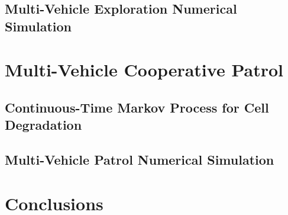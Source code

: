 \subsection{Multi-Vehicle Exploration Numerical Simulation}

\section{Multi-Vehicle Cooperative Patrol}

\subsection{Continuous-Time Markov Process for Cell Degradation}

\subsection{Multi-Vehicle Patrol Numerical Simulation}

\section{Conclusions}





